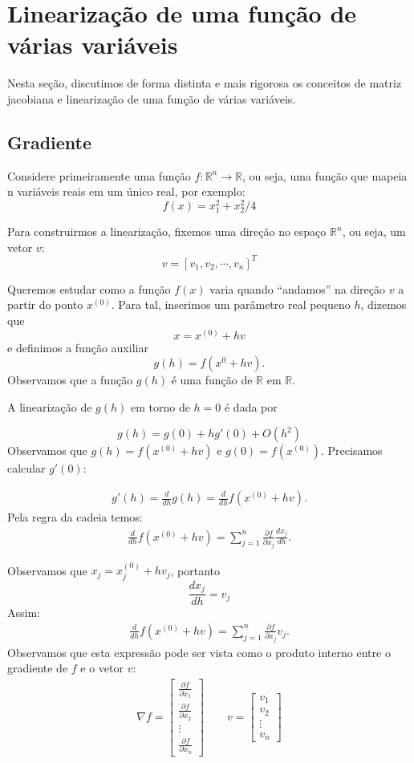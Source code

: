 \section{Linearização de uma função de várias variáveis}
Nesta seção, discutimos de forma distinta e mais rigorosa os conceitos de matriz jacobiana e linearização de uma função de várias variáveis.
\subsection{Gradiente}

Considere primeiramente uma função $f:\mathbb{R}^n\to \mathbb{R}$, ou seja, uma função que mapeia n variáveis reais em um único real, por exemplo:
$$f(x)=x_1^2+x_2^2/4$$

Para construirmos a linearização, fixemos uma direção no espaço $\mathbb{R}^n$, ou seja, um vetor $v$:
$$v=[v_1,  v_2,  \cdots,  v_n]^T$$

Queremos estudar como a função $f(x)$ varia quando ``andamos'' na direção $v$ a partir do ponto $x^{(0)}$. Para tal, inserimos um parâmetro  real pequeno $h$, dizemos que $$x=x^{(0)}+hv$$ e definimos a função auxiliar
$$g(h)=f(x^{0}+hv).$$
Observamos que a função $g(h)$ é uma função de $\mathbb{R}$ em $\mathbb{R}$.

A linearização de $g(h)$ em torno de $h=0$ é dada por

$$g(h)=g(0) + hg'(0) +O(h^2)$$
Observamos que $g(h)=f(x^{(0)}+hv)$ e $g(0)=f(x^{(0)})$. Precisamos calcular $g'(0)$:

\begin{eqnarray*}
g'(h)=\frac{d}{dh}g(h)=\frac{d}{dh}f(x^{(0)}+hv).
\end{eqnarray*}
Pela regra da cadeia temos:
\begin{eqnarray*}
\frac{d}{dh}f(x^{(0)}+hv)= \sum_{j=1}^n \frac{\partial f}{\partial x_j}\frac{d x_j}{d h}.
\end{eqnarray*}

Observamos que $x_j=x^{(0)}_j+hv_j$, portanto
$$\frac{d x_j}{d h}=v_j$$
Assim:
\begin{eqnarray*}
\frac{d}{dh}f(x^{(0)}+hv)= \sum_{j=1}^n \frac{\partial f}{\partial x_j}v_j.
\end{eqnarray*}
Observamos que esta expressão pode ser vista como o produto interno entre o gradiente de $f$ e o vetor $v$:
\begin{eqnarray*}
\nabla f = \left[
\begin{matrix}
\frac{\partial f}{\partial x_1} \\
\frac{\partial f}{\partial x_2} \\
\vdots\\
\frac{\partial f}{\partial x_n}
\end{matrix}
\right] \qquad v=\left[
\begin{matrix}
v_1\\
v_2\\
\vdots\\
v_n
\end{matrix}
\right]
\end{eqnarray*}

